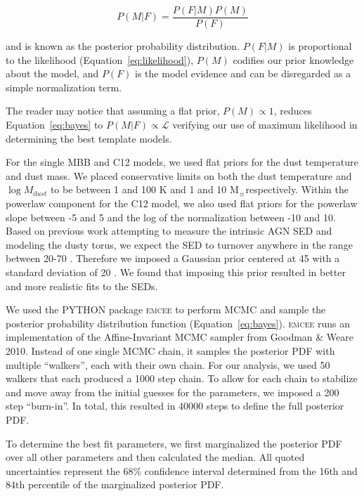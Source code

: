 \documentclass[fleqn, usenatbib]{mnras}
\newcommand{\msun}{M$_{\sun}$}
\begin{document}
\begin{equation}\label{eq:bayes}
P(M|F) = \frac{P(F|M)P(M)}{P(F)}
\end{equation}

\noindent and is known as the posterior probability distribution. $P(F|M)$ is proportional to the likelihood (Equation~\ref{eq:likelihood}), $P(M)$ codifies our prior knowledge about the model, and $P(F)$ is the model evidence and can be disregarded as a simple normalization term. 

The reader may notice that assuming a flat prior, $P(M) \propto 1$, reduces Equation~\ref{eq:bayes} to $P(M|F) \propto \mathcal{L}$ verifying our use of maximum likelihood in determining the best template models.

For the single MBB and C12 models, we used flat priors for the dust temperature and dust mass. We placed conservative limits on both the dust temperature and $\log M_{\mathrm dust}$ to be between 1 and 100 K and 1 and 10 \msun respectively. Within the powerlaw component for the C12 model, we also used flat priors for the powerlaw slope between -5 and 5 and the log of the normalization between -10 and 10. Based on previous work attempting to measure the intrinsic AGN SED and modeling the dusty torus, we expect the SED to turnover anywhere in the range between 20-70 \micron. Therefore we imposed a Gaussian prior centered at 45 \micron{} with a standard deviation of 20 \micron. We found that imposing this prior resulted in better and more realistic fits to the SEDs.

We used the \textsc{PYTHON} package \textsc{emcee} \citep{Foreman-Mackey:2013lr} to perform MCMC and sample the posterior probability distribution function (Equation~\ref{eq:bayes}). \textsc{emcee} runs an implementation of the Affine-Invariant MCMC sampler from Goodman \& Weare 2010. Instead of one single MCMC chain, it samples the posterior PDF with multiple ``walkers'', each with their own chain. For our analysis, we used 50 walkers that each produced a 1000 step chain. To allow for each chain to stabilize and move away from the initial guesses for the parameters, we imposed a 200 step ``burn-in''. In total, this resulted in 40000 steps to define the full posterior PDF. 

To determine the best fit parameters, we first marginalized the posterior PDF over all other parameters and then calculated the median. All quoted uncertainties represent the 68\% confidence interval determined from the 16th and 84th percentile of the marginalized posterior PDF.
\end{document}
